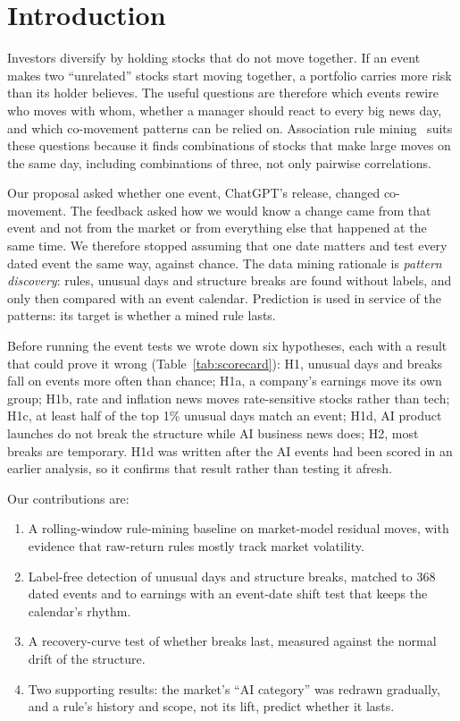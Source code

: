 \documentclass[conference]{IEEEtran}
\begin{document}
\section{Introduction}
Investors diversify by holding stocks that do not move together. If an event makes two ``unrelated'' stocks start moving together, a portfolio carries more risk than its holder believes. The useful questions are therefore which events rewire who moves with whom, whether a manager should react to every big news day, and which co-movement patterns can be relied on. Association rule mining~\cite{agrawal1993} suits these questions because it finds combinations of stocks that make large moves on the same day, including combinations of three, not only pairwise correlations.

Our proposal asked whether one event, ChatGPT's release, changed co-movement. The feedback asked how we would know a change came from that event and not from the market or from everything else that happened at the same time. We therefore stopped assuming that one date matters and test every dated event the same way, against chance. The data mining rationale is \emph{pattern discovery}: rules, unusual days and structure breaks are found without labels, and only then compared with an event calendar. Prediction is used in service of the patterns: its target is whether a mined rule lasts.

Before running the event tests we wrote down six hypotheses, each with a result that could prove it wrong (Table~\ref{tab:scorecard}): H1, unusual days and breaks fall on events more often than chance; H1a, a company's earnings move its own group; H1b, rate and inflation news moves rate-sensitive stocks rather than tech; H1c, at least half of the top 1\% unusual days match an event; H1d, AI product launches do not break the structure while AI business news does; H2, most breaks are temporary. H1d was written after the AI events had been scored in an earlier analysis, so it confirms that result rather than testing it afresh.

Our contributions are:
\begin{enumerate}
\item A rolling-window rule-mining baseline on market-model residual moves, with evidence that raw-return rules mostly track market volatility.
\item Label-free detection of unusual days and structure breaks, matched to 368 dated events and to earnings with an event-date shift test that keeps the calendar's rhythm.
\item A recovery-curve test of whether breaks last, measured against the normal drift of the structure.
\item Two supporting results: the market's ``AI category'' was redrawn gradually, and a rule's history and scope, not its lift, predict whether it lasts.
\end{enumerate}
\end{document}
